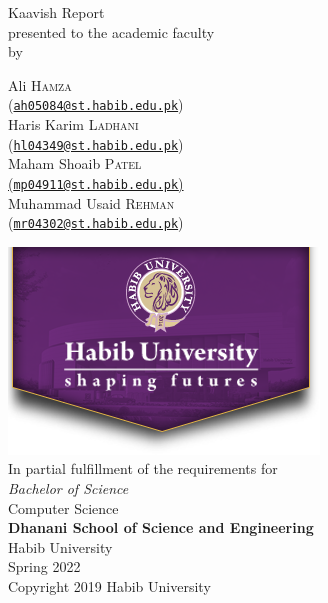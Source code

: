 \begin{titlepage}
  
  \begin{center}
    \vfill
    \textbf{\Huge \Title}
    \bigskip

    {\large Kaavish Report\\
      presented to the academic faculty\\
      by\\\bigskip
  \begin{minipage}{0.85\textwidth} %
    \begin{center} \large
    Ali \textsc{Hamza}\\ (\href{mailto:ah05084@st.habib.edu.pk}{\texttt{ah05084@st.habib.edu.pk}}) \\
    Haris Karim \textsc{Ladhani}\\ (\href{mailto:hl04349@st.habib.edu.pk}{\texttt{hl04349@st.habib.edu.pk}})\\
    Maham Shoaib \textsc{Patel} \\ \href{mailto: (mp04911@st.habib.edu.pk)}{(\texttt{mp04911@st.habib.edu.pk})}\\
    Muhammad Usaid \textsc{Rehman} \\ (\href{mailto:mr04302@st.habib.edu.pk}{\texttt{mr04302@st.habib.edu.pk}}) \\
    \end{center}
\end{minipage}



    }\vfill
    \includegraphics[width=.4\textwidth]{./HU_logo_new.png}\\
    {\large In partial fulfillment of the requirements for\\
      \textit{Bachelor of Science}\\
      Computer Science\\\medskip
      \textbf{Dhanani School of Science and Engineering}\\\medskip
      Habib University\\\smallskip
      Spring 2022
    }\\\vfill
    Copyright {\scriptsize \textcopyright} 2019 Habib University
  \end{center}
  \restoregeometry
\end{titlepage}

